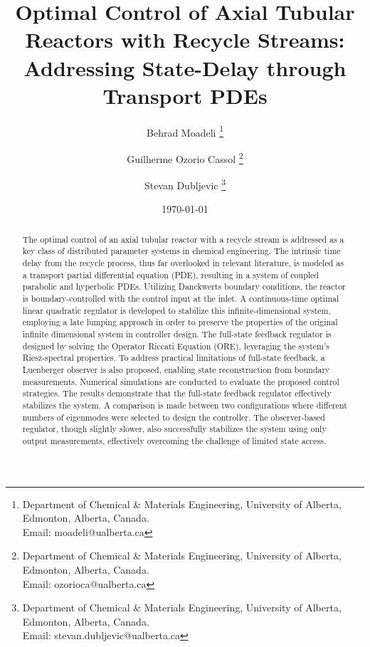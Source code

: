 \documentclass[letterpaper,11pt]{article}
\title{Optimal Control of Axial Tubular Reactors with Recycle Streams:\\Addressing State-Delay through Transport PDEs}
\author{
  Behrad Moadeli \thanks{Department of Chemical \& Materials Engineering, University of Alberta, Edmonton, Alberta, Canada. \\Email: moadeli@ualberta.ca} \and
  Guilherme Ozorio Cassol \thanks{Department of Chemical \& Materials Engineering, University of Alberta, Edmonton, Alberta, Canada. \\Email: ozorioca@ualberta.ca} \and
  Stevan Dubljevic \thanks{Department of Chemical \& Materials Engineering, University of Alberta, Edmonton, Alberta, Canada. \\Email: stevan.dubljevic@ualberta.ca}
}
\date{\today}
\begin{document}
\maketitle

\begin{abstract}
    The optimal control of an axial tubular reactor with a recycle stream is addressed as a key class of distributed parameter systems in chemical engineering. The intrinsic time delay from the recycle process, thus far overlooked in relevant literature, is modeled as a transport partial differential equation (PDE), resulting in a system of coupled parabolic and hyperbolic PDEs. Utilizing Danckwerts boundary conditions, the reactor is boundary-controlled with the control input at the inlet. A continuous-time optimal linear quadratic regulator is developed to stabilize this infinite-dimensional system, employing a late lumping approach in order to preserve the properties of the original infinite dimensional system in controller design. The full-state feedback regulator is designed by solving the Operator Riccati Equation (ORE), leveraging the system's Riesz-spectral properties. To address practical limitations of full-state feedback, a Luenberger observer is also proposed, enabling state reconstruction from boundary measurements. 
    Numerical simulations are conducted to evaluate the proposed control strategies. The results demonstrate that the full-state feedback regulator effectively stabilizes the system. A comparison is made between two configurations where different numbers of eigenmodes were selected to design the controller. The observer-based regulator, though slightly slower, also successfully stabilizes the system using only output measurements, effectively overcoming the challenge of limited state access.
\end{abstract}

\newpage
\tableofcontents
\newpage


  
  
  
  
  
    
  

  
  
  \newpage
  \printbibliography



\end{document}
